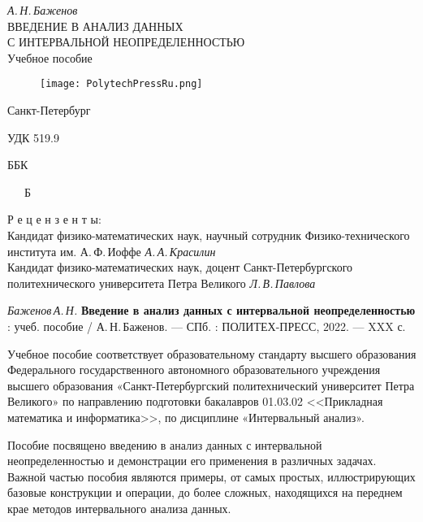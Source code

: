 \documentclass[a5paper,openany]{book}
\begin{document}
{\begin{center}
	
	
	
	
	\Large{\it А.\,Н.\,Баженов\\
		\hfill \break		\hfill \break		}
	{\Large	ВВЕДЕНИЕ В АНАЛИЗ ДАННЫХ\\
		С ИНТЕРВАЛЬНОЙ НЕОПРЕДЕЛЕННОСТЬЮ}\\
	\hfill \break 	\hfill \break	
	\Large{	Учебное пособие	
	}\\
\end{center}

\hfill \break		\hfill \break	
\begin{figure}[h]
	\centering
	\texttt{[image: PolytechPressRu.png]}
\end{figure}
\begin{center}\Large{Санкт-Петербург \\
		\hfill {}} \end{center}
\thispagestyle{empty} %


\newpage
УДК 519.9

ББК

~~~Б


\begin{center}
	Р е ц е н з е н т ы:\\
	
	Кандидат физико-математических наук, научный сотрудник Физико-технического института им. А.\,Ф.\,Иоффе
	{\it А.\,А.\,Красилин}\\
	Кандидат физико-математических наук, доцент Санкт-Петербургского политехнического  университета Петра Великого {\it Л.\,В.\,Павлова}
\end{center}

{\it Баженов\,А.\,Н.}
{\bf Введение в анализ данных с интервальной неопределенностью} : учеб. пособие /  А.\,Н.\,Баженов.
--- СПб. : ПОЛИТЕХ-ПРЕСС, 2022. --- XXX с.
\hfill \break

{\small 
	Учебное пособие соответствует образовательному стандарту высшего
	образования Федерального государственного автономного образовательного учреждения высшего образования «Санкт-Петербургский политехнический университет Петра Великого» по направлению подготовки бакалавров 01.03.02 <<Прикладная математика и информатика>>, по дисциплине «Интервальный анализ».
	
	
	Пособие посвящено введению в анализ данных с интервальной неопределенностью
	и демонстрации его применения в различных задачах.  
	Важной частью пособия являются примеры, от самых простых, иллюстрирующих базовые конструкции и операции, до более сложных, находящихся на переднем крае методов интервального анализа данных. 
	
}}
\end{document}
